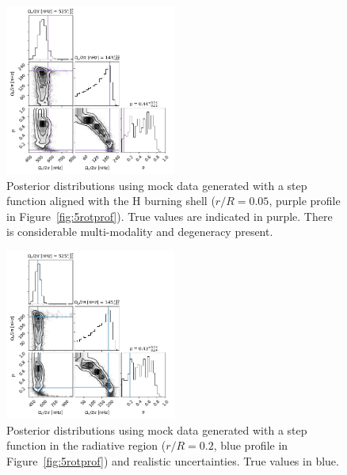 \begin{figure}[h]
\centering
    \includegraphics[width=0.5\textwidth]{Figures/subgiant_chapter_figures/10.05_corner.png}
    \caption{
    Posterior distributions using mock data generated with a step function aligned with the H burning shell ($r/R = 0.05$, purple profile in Figure~\ref{fig:5rotprof}). True values are indicated in purple. There is considerable multi-modality and degeneracy present.}
    \label{fig:mock_posterior_005_uniform}
\end{figure}


\begin{figure}[h]
\centering
    \includegraphics[width=0.5\textwidth]{Figures/subgiant_chapter_figures/10.2_corner.png}
    \caption{Posterior distributions using mock data generated with a step function in the radiative region ($r/R = 0.2$, blue profile in Figure~\ref{fig:5rotprof}) and realistic uncertainties. True values in blue.}
    \label{fig:mock_posterior_020_uniform}
\end{figure}

